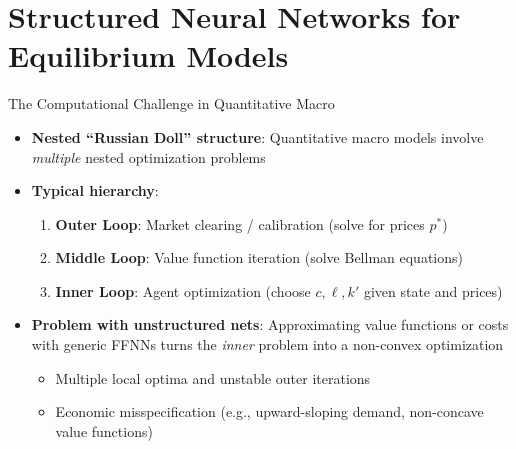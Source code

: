 \documentclass[10pt,english,aspectratio=169]{beamer}
\begin{document}
\section{Structured Neural Networks for Equilibrium Models}

\begin{frame}{The Computational Challenge in Quantitative Macro}
\begin{itemize}
  \item \textbf{Nested ``Russian Doll'' structure}: Quantitative macro models involve \emph{multiple} nested optimization problems
  \medskip
  \item \textbf{Typical hierarchy}:
    \begin{enumerate}
      \item \textbf{Outer Loop}: Market clearing / calibration (solve for prices $p^*$)
      \item \textbf{Middle Loop}: Value function iteration (solve Bellman equations)
      \item \textbf{Inner Loop}: Agent optimization (choose $c, \ell, k'$ given state and prices)
    \end{enumerate}
  \medskip
  \item \textbf{Problem with unstructured nets}: Approximating value functions or costs with generic FFNNs turns the \emph{inner} problem into a non-convex optimization
    \begin{itemize}
      \item Multiple local optima and unstable outer iterations
      \item Economic misspecification (e.g., upward-sloping demand, non-concave value functions)
    \end{itemize}
\end{itemize}
\end{frame}
\end{document}
